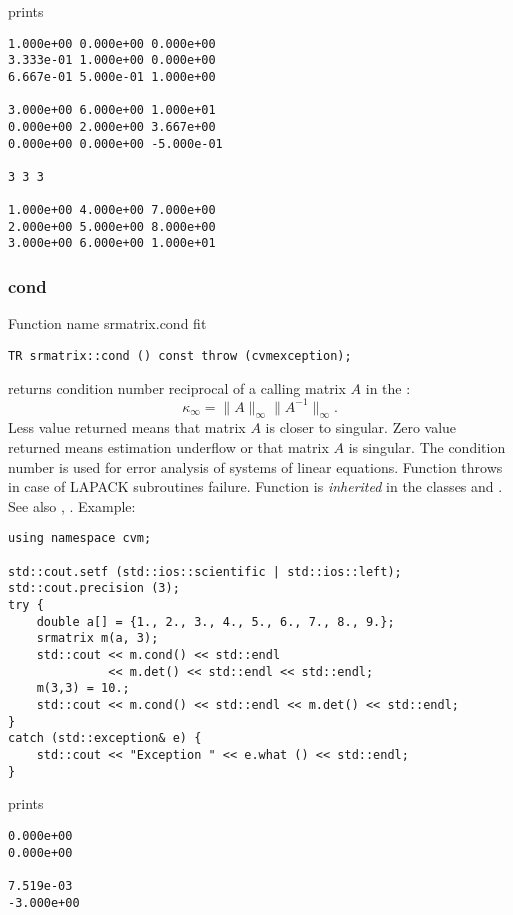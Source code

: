 prints
\begin{Verbatim}
1.000e+00 0.000e+00 0.000e+00
3.333e-01 1.000e+00 0.000e+00
6.667e-01 5.000e-01 1.000e+00

3.000e+00 6.000e+00 1.000e+01
0.000e+00 2.000e+00 3.667e+00
0.000e+00 0.000e+00 -5.000e-01

3 3 3

1.000e+00 4.000e+00 7.000e+00
2.000e+00 5.000e+00 8.000e+00
3.000e+00 6.000e+00 1.000e+01
\end{Verbatim}
\newpage





\subsubsection{cond}
Function%
\pdfdest name {srmatrix.cond} fit
\begin{verbatim}
TR srmatrix::cond () const throw (cvmexception);
\end{verbatim}
returns  condition number reciprocal of 
a calling matrix $A$ in the :
\begin{equation*}
\kappa_\infty=\|A\|_\infty \|A^{-1}\|_\infty.
\end{equation*}
Less value returned means that matrix $A$ is closer to singular.
Zero value returned means estimation underflow or
that matrix $A$ is singular.
The condition number is used for error analysis
of systems of linear equations.
Function throws  in case of LAPACK
subroutines failure.
Function is \emph{inherited} in the classes
and .
See also
, .
Example:
\begin{Verbatim}
using namespace cvm;

std::cout.setf (std::ios::scientific | std::ios::left); 
std::cout.precision (3);
try {
    double a[] = {1., 2., 3., 4., 5., 6., 7., 8., 9.};
    srmatrix m(a, 3);
    std::cout << m.cond() << std::endl 
              << m.det() << std::endl << std::endl;
    m(3,3) = 10.;
    std::cout << m.cond() << std::endl << m.det() << std::endl;
}
catch (std::exception& e) {
    std::cout << "Exception " << e.what () << std::endl;
}
\end{Verbatim}
prints
\begin{Verbatim}
0.000e+00
0.000e+00

7.519e-03
-3.000e+00
\end{Verbatim}
\newpage



